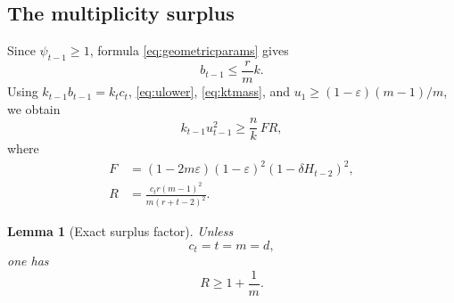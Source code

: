 \documentclass[11pt]{amsart}
\newtheorem{lemma}[theorem]{Lemma}
\theoremstyle{definition}
\newcommand{\eps}{\varepsilon}
\begin{document}
\subsection{The multiplicity surplus}
Since $\psi_{t-1}\ge1$, formula \eqref{eq:geometricparams} gives
\[
 b_{t-1}\le\frac{r}{m}k.
\]
Using $k_{t-1}b_{t-1}=k_t c_t$, \eqref{eq:ulower}, \eqref{eq:ktmass}, and
$u_1\ge(1-\eps)(m-1)/m$, we obtain
\begin{equation}\label{eq:FR}
 k_{t-1}u_{t-1}^2\ge\frac nk\,F R,
\end{equation}
where
\begin{align}
 F&=(1-2m\eps)(1-\eps)^2
      \left(1-\delta H_{t-2}\right)^2,
      \label{eq:F}\\
 R&=\frac{c_t r(m-1)^2}{m(r+t-2)^2}.
      \label{eq:R}
\end{align}

\begin{lemma}[Exact surplus factor]\label{lem:R}
Unless
\begin{equation}\label{eq:endpoint}
 c_t=t=m=d,
\end{equation}
one has
\begin{equation}\label{eq:Rbound}
 R\ge1+\frac1m.
\end{equation}
\end{lemma}
\end{document}
